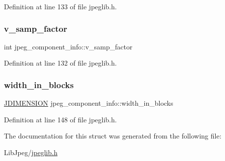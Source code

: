 Definition at line 133 of file jpeglib.\+h.

\mbox{\label{structjpeg__component__info_a83b263da2a749a8fe96be728889af0df}} 
\subsubsection{\texorpdfstring{v\_samp\_factor}{v\_samp\_factor}}
{\footnotesize\ttfamily int jpeg\+\_\+component\+\_\+info\+::v\+\_\+samp\+\_\+factor}



Definition at line 132 of file jpeglib.\+h.

\mbox{\label{structjpeg__component__info_a059454e8192effeabc6eab34e2ad198d}} 
\subsubsection{\texorpdfstring{width\_in\_blocks}{width\_in\_blocks}}
{\footnotesize\ttfamily \mbox{\hyperlink{jmorecfg_8h_a04ed4674f6f1d0d50ec241531e38274f}{J\+D\+I\+M\+E\+N\+S\+I\+ON}} jpeg\+\_\+component\+\_\+info\+::width\+\_\+in\+\_\+blocks}



Definition at line 148 of file jpeglib.\+h.



The documentation for this struct was generated from the following file\+:\begin{DoxyCompactItemize}
\item 
Lib\+Jpeg/\mbox{\hyperlink{jpeglib_8h}{jpeglib.\+h}}\end{DoxyCompactItemize}
